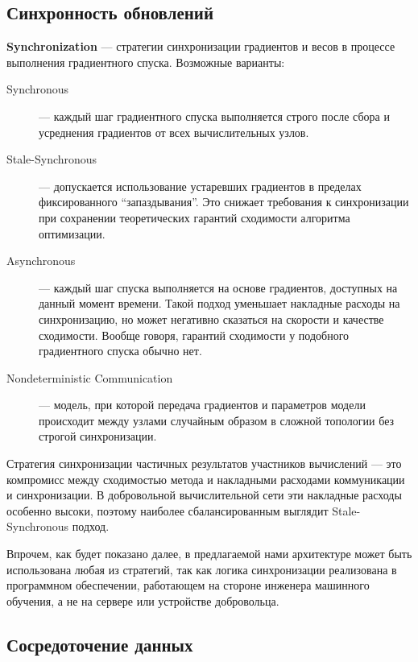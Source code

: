 \documentclass[a4paper,12pt]{extarticle}
\begin{document}
\subsection{Синхронность обновлений}

    \textbf{Synchronization} — стратегии синхронизации градиентов и весов в процессе выполнения градиентного спуска.
    Возможные варианты:
    \begin{description}
        \item[Synchronous] — каждый шаг градиентного спуска выполняется строго после сбора и усреднения градиентов от всех вычислительных узлов.
        \item[Stale-Synchronous] — допускается использование устаревших градиентов в пределах фиксированного ``запаздывания''.
        Это снижает требования к синхронизации при сохранении теоретических гарантий сходимости алгоритма оптимизации.
        \item[Asynchronous] — каждый шаг спуска выполняется на основе градиентов, доступных на данный момент времени.
        Такой подход уменьшает накладные расходы на синхронизацию, но может негативно сказаться на скорости и качестве сходимости.
        Вообще говоря, гарантий сходимости у подобного градиентного спуска обычно нет.
        \item[Nondeterministic Communication] — модель, при которой передача градиентов и параметров модели происходит между узлами случайным образом в сложной топологии без строгой синхронизации.
    \end{description}

    Стратегия синхронизации частичных результатов участников вычислений — это компромисс между сходимостью метода и накладными расходами коммуникации и синхронизации.
    В добровольной вычислительной сети эти накладные расходы особенно высоки, поэтому наиболее сбалансированным выглядит Stale-Synchronous подход.

    Впрочем, как будет показано далее, в предлагаемой нами архитектуре может быть использована любая из стратегий, так как логика синхронизации реализована в программном обеспечении, работающем на стороне инженера машинного обучения, а не на сервере или устройстве добровольца.

\subsection{Сосредоточение данных}
\end{document}
